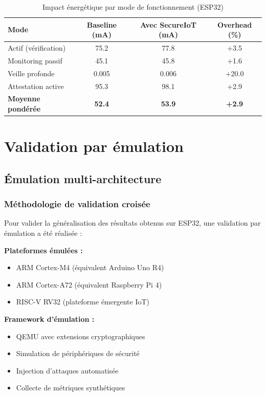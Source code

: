 \begin{table}[h]
\centering
\caption{Impact énergétique par mode de fonctionnement (ESP32)}
\label{tab:energy-impact-esp32}
\begin{tabular}{|l|c|c|c|}
\hline
\textbf{Mode} & \textbf{Baseline (mA)} & \textbf{Avec SecureIoT (mA)} & \textbf{Overhead (\%)} \\
\hline
Actif (vérification) & 75.2 & 77.8 & +3.5 \\
Monitoring passif & 45.1 & 45.8 & +1.6 \\
Veille profonde & 0.005 & 0.006 & +20.0 \\
Attestation active & 95.3 & 98.1 & +2.9 \\
\hline
\textbf{Moyenne pondérée} & \textbf{52.4} & \textbf{53.9} & \textbf{+2.9} \\
\hline
\end{tabular}
\end{table}

\section{Validation par émulation}

\subsection{Émulation multi-architecture}

\subsubsection{Méthodologie de validation croisée}

Pour valider la généralisation des résultats obtenus sur ESP32, une validation par émulation a été réalisée :

\textbf{Plateformes émulées :}
\begin{itemize}
    \item ARM Cortex-M4 (équivalent Arduino Uno R4)
    \item ARM Cortex-A72 (équivalent Raspberry Pi 4)
    \item RISC-V RV32 (plateforme émergente IoT)
\end{itemize}

\textbf{Framework d'émulation :}
\begin{itemize}
    \item QEMU avec extensions cryptographiques
    \item Simulation de périphériques de sécurité
    \item Injection d'attaques automatisée
    \item Collecte de métriques synthétiques
\end{itemize}

